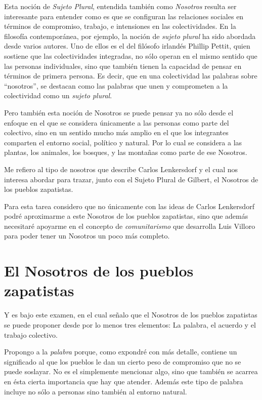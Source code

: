 \documentclass[oneside]{book}
\begin{document}
Esta noción de \textit{Sujeto Plural}, entendida también como \textit{Nosotros} resulta ser interesante para entender como es que se configuran las relaciones sociales en términos de compromiso, trabajo, e intensiones en las colectividades. En la filosofía contemporánea, por ejemplo, la noción de \textit{sujeto plural} ha sido abordada desde varios autores. Uno de ellos es el del filósofo irlandés Phillip Pettit, quien sostiene que las colectividades integradas, no sólo operan en el mismo sentido que las personas individuales, sino que también tienen la capacidad de pensar en términos de primera persona. Es decir, que en una colectividad las palabras sobre “nosotros”, se destacan como las palabras que unen y comprometen a la colectividad como un \textit{sujeto plural}\cite{pettit}.

Pero también esta noción de Nosotros se puede pensar ya no sólo desde el enfoque en el que se considera únicamente a las personas como parte del colectivo, sino en un sentido mucho más amplio en el que los integrantes comparten el entorno social, político y natural. Por lo cual se considera a las plantas, los animales, los bosques, y las montañas como parte de ese Nosotros. 

Me refiero al tipo de nosotros que describe Carlos Lenkersdorf y el cual nos interesa abordar para trazar, junto con el Sujeto Plural de Gilbert, el Nosotros de los pueblos zapatistas.

Para esta tarea considero que no únicamente con las ideas de Carlos Lenkersdorf podré aproximarme a este Nosotros de los pueblos zapatistas, sino que además necesitaré apoyarme en el concepto de \textit{comunitarismo} que desarrolla Luis Villoro para poder tener un Nosotros un poco más completo.

\chapter{El Nosotros de los pueblos zapatistas}

Y es bajo este examen, en el cual señalo que el Nosotros de los pueblos zapatistas se puede proponer desde por lo menos tres elementos: La palabra, el acuerdo y el trabajo colectivo.

Propongo a la \textit{palabra} porque, como expondré con más detalle, contiene un significado al que los pueblos le dan un cierto peso de compromiso que no se puede soslayar. No es el simplemente mencionar algo, sino que también se acarrea en ésta cierta importancia que hay que atender. Además este tipo de palabra incluye no sólo a personas sino también al entorno natural.
\end{document}
